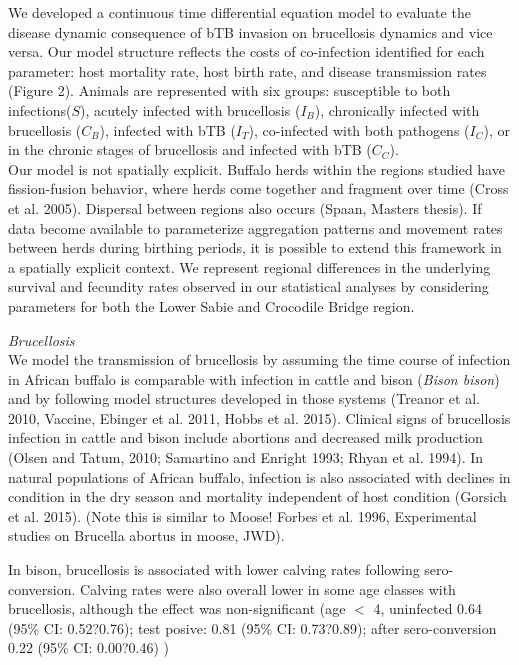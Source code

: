 \documentclass[letterpaper,12pt]{article}
\begin{document}
\indent
	We developed a continuous time differential equation model to evaluate the disease dynamic consequence of bTB invasion on brucellosis dynamics and vice versa.  
Our model structure reflects the costs of co-infection identified for each parameter: host mortality rate, host birth rate, and disease transmission rates (Figure 2).
Animals are represented with six groups: susceptible to both infections($S$), acutely infected with brucellosis ($I_B$), chronically infected with brucellosis ($C_B$), infected with bTB ($I_T$), co-infected with both pathogens ($I_C$), or in the chronic stages of brucellosis and infected with bTB ($C_C$).\\
Our model is not spatially explicit.  Buffalo herds within the regions studied have fission-fusion behavior, where herds come together and fragment over time (Cross et al. 2005).  Dispersal between regions also occurs (Spaan, Masters thesis).  If data become available to parameterize aggregation patterns and movement rates between herds during birthing periods, it is possible to extend this framework in a spatially explicit context.  We represent regional differences in the underlying survival and fecundity rates observed in our statistical analyses by considering parameters for both the Lower Sabie and Crocodile Bridge region.

\noindent
\textit{Brucellosis}\\
	We model the transmission of brucellosis by assuming the time course of infection in African buffalo is comparable with infection in cattle and bison (\textit{Bison bison}) and by following model structures developed in those systems (Treanor et al. 2010, Vaccine, Ebinger et al. 2011, Hobbs et al. 2015).  
Clinical signs of brucellosis infection in cattle and bison include abortions and decreased milk production (Olsen and Tatum, 2010; Samartino and Enright 1993; Rhyan et al. 1994).  
In natural populations of African buffalo, infection is also associated with declines in condition in the dry season and mortality independent of host condition (Gorsich et al. 2015).  (Note this is similar to Moose! Forbes et al. 1996, Experimental studies on Brucella abortus in moose, JWD). 

In bison, brucellosis is associated with lower calving rates following sero-conversion.  Calving rates were also overall lower in some age classes with brucellosis, although the effect was non-significant (age $<$ 4, uninfected 0.64 (95\% CI: 0.52?0.76); test posive: 0.81 (95\% CI: 0.73?0.89);  after sero-conversion 0.22 (95\% CI: 0.00?0.46) )
\end{document}
